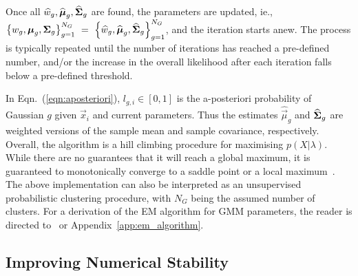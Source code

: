 \noindent
Once all $\widehat{w}_g, \widehat{{\boldsymbol{\mu}}}_g, \widehat{{\boldsymbol{\Sigma}}}_g$ are found, the parameters are updated,
ie., $\left\{ w_g, {\boldsymbol{\mu}}_g, {\boldsymbol{\Sigma}}_g \right\}_{g=1}^{N_G} ~ = ~ \left\{ \widehat{w}_g, \widehat{{\boldsymbol{\mu}}}_g, \widehat{{\boldsymbol{\Sigma}}}_g \right\}_{g=1}^{N_G}$,
and the iteration starts anew.
The process is typically repeated until the number of iterations has reached a pre-defined number,
and/or the increase in the overall likelihood after each iteration falls below a pre-defined threshold.

\noindent In Eqn.~(\ref{eqn:aposteriori}), $l_{g,i} \in [0,1]$ is the {a-posteriori} probability of Gaussian $g$ given $\Vec{x}_i$ and current parameters.
Thus the estimates $\widehat{\Vec{\mu}}_g$ and $\widehat{{\boldsymbol{\Sigma}}}_g$ are weighted versions of the
sample mean and sample covariance, respectively.
Overall, the algorithm is a hill climbing procedure for maximising $p(X | \lambda)$.
While there are no guarantees that it will reach a global maximum, it is guaranteed to monotonically converge to a saddle point or a local maximum~\cite{Dempster77,Duda01,Mitchell97}.
The above implementation can also be interpreted as an unsupervised probabilistic clustering procedure,
with $N_G$ being the assumed number of clusters.
For a derivation of the EM algorithm for GMM parameters, the reader is directed to~\cite{Bilmes98,Redner84} or Appendix~\ref{app:em_algorithm}.


\subsection{Improving Numerical Stability}

